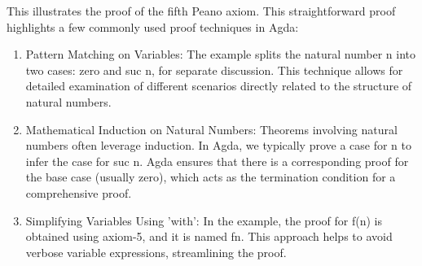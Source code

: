 
This illustrates the proof of the fifth Peano axiom. This straightforward proof highlights a few commonly used proof techniques in Agda:
\begin{enumerate}[1.]
\item Pattern Matching on Variables: The example splits the natural number n into two cases: zero and suc n, for separate discussion. This technique allows for detailed examination of different scenarios directly related to the structure of natural numbers.
\item Mathematical Induction on Natural Numbers: Theorems involving natural numbers often leverage induction. In Agda, we typically prove a case for n to infer the case for suc n. Agda ensures that there is a corresponding proof for the base case (usually zero), which acts as the termination condition for a comprehensive proof.
\item Simplifying Variables Using 'with': In the example, the proof for f(n) is obtained using axiom-5, and it is named fn. This approach helps to avoid verbose variable expressions, streamlining the proof.
\end{enumerate}

